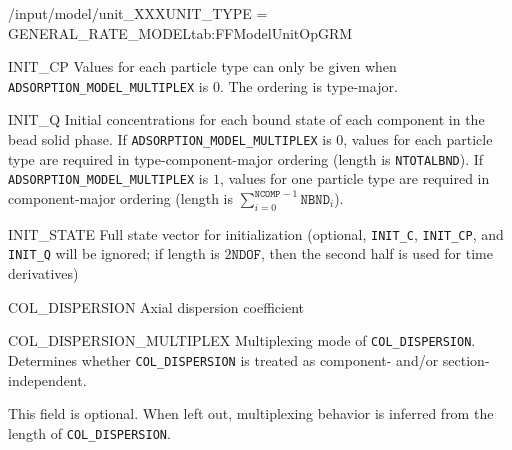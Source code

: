 \begin{condsubgroup}{/input/model/unit\_XXX}{UNIT\_TYPE = GENERAL\_RATE\_MODEL}{tab:FFModelUnitOpGRM}
\begin{dataset}[unit=\si{\mol\per\cubic\metre\of{MP}},type=double,range={$\geq 0$},length={\texttt{NCOMP} / $\texttt{NPARTYPE} \cdot \texttt{NCOMP}$}]{INIT\_CP}
    Values for each particle type can only be given when \texttt{ADSORPTION\_MODEL\_MULTIPLEX} is $0$.
    The ordering is type-major.
  \end{dataset}
  \begin{dataset}[unit=\si{\mol\per\cubic\metre\of{SP}},type=double,range={$\geq 0$},length={\texttt{NTOTALBND} / $\sum_{i = 0}^{\texttt{NCOMP} - 1} \texttt{NBND}_i$}]{INIT\_Q}
    Initial concentrations for each bound state of each component in the bead solid phase.
    If \texttt{ADSORPTION\_MODEL\_MULTIPLEX} is $0$, values for each particle type are required in type-component-major ordering (length is \texttt{NTOTALBND}).
    If \texttt{ADSORPTION\_MODEL\_MULTIPLEX} is $1$, values for one particle type are required in component-major ordering (length is $\sum_{i = 0}^{\texttt{NCOMP} - 1} \texttt{NBND}_i$).
  \end{dataset}
  \begin{dataset}[unit=various,type=double,range={$\mathds{R}$},length={\texttt{NDOF} / $2\texttt{NDOF}$}]{INIT\_STATE}
    Full state vector for initialization (optional, \texttt{INIT\_C}, \texttt{INIT\_CP}, and \texttt{INIT\_Q} will be ignored; if length is $2\texttt{NDOF}$, then the second half is used for time derivatives)
  \end{dataset}
  \begin{dataset}[unit=\si{\square\metre\of{IV}\per\second},type=double,range={$\geq 0$},length={see \texttt{COL\_DISPERSION\_MULTIPLEX}}]{COL\_DISPERSION}
    Axial dispersion coefficient
  \end{dataset}
  \begin{dataset}[unit=--,type=int,range={$\{0, \dots, 3 \}$},length={1}]{COL\_DISPERSION\_MULTIPLEX}
    Multiplexing mode of \texttt{COL\_DISPERSION}.
    Determines whether \texttt{COL\_DISPERSION} is treated as component- and/or section-independent.

    This field is optional.
    When left out, multiplexing behavior is inferred from the length of \texttt{COL\_DISPERSION}.


\end{dataset}
\end{condsubgroup}
